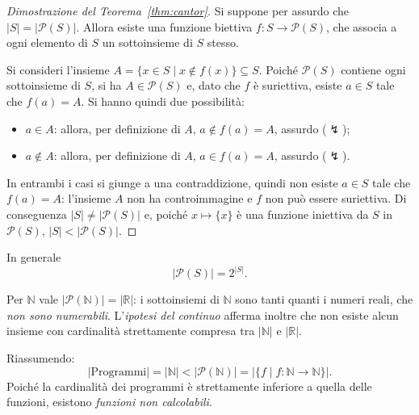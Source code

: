 \documentclass[a4paper, 11pt, oneside]{book}
\theoremstyle{formale}
\begin{document}
    \begin{proof}[Dimostrazione del Teorema~\ref{thm:cantor}]
        Si suppone per assurdo che $|S| = |\mathcal{P}(S)|$. Allora esiste una funzione
        biettiva $f \colon S \to \mathcal{P}(S)$, che associa a ogni elemento di $S$ un
        sottoinsieme di $S$ stesso.

        Si consideri l'insieme $A = \{x \in S \mid x \notin f(x)\} \subseteq S$. Poich\'e
        $\mathcal{P}(S)$ contiene ogni sottoinsieme di $S$, si ha $A \in \mathcal{P}(S)$ e,
        dato che $f$ \`e suriettiva, esiste $a \in S$ tale che $f(a) = A$. Si hanno quindi due
        possibilit\`a:
        \begin{itemize}
            \item $a \in A$: allora, per definizione di $A$, $a \notin f(a) = A$, assurdo
                ($\lightning$);
            \item $a \notin A$: allora, per definizione di $A$, $a \in f(a) = A$, assurdo
                ($\lightning$).
        \end{itemize}
        In entrambi i casi si giunge a una contraddizione, quindi non esiste $a \in S$ tale
        che $f(a) = A$: l'insieme $A$ non ha controimmagine e $f$ non pu\`o essere
        suriettiva. Di conseguenza $|S| \neq |\mathcal{P}(S)|$ e, poich\'e
        $x \mapsto \{x\}$ \`e una funzione iniettiva da $S$ in $\mathcal{P}(S)$,
        $|S| < |\mathcal{P}(S)|$.
    \end{proof}

    In generale
    \begin{equation*}
        |\mathcal{P}(S)| = 2^{|S|}.
    \end{equation*}

    Per $\mathbb{N}$ vale $|\mathcal{P}(\mathbb{N})| = |\mathbb{R}|$: i sottoinsiemi di
    $\mathbb{N}$ sono tanti quanti i numeri reali, che \emph{non sono numerabili}.
    L'\emph{ipotesi del continuo} afferma inoltre che non esiste alcun insieme con
    cardinalit\`a strettamente compresa tra $|\mathbb{N}|$ e $|\mathbb{R}|$.

    Riassumendo:
    \begin{equation*}
        |\text{Programmi}| = |\mathbb{N}|
        < |\mathcal{P}(\mathbb{N})|
        = |\{f \mid f \colon \mathbb{N} \to \mathbb{N}\}|.
    \end{equation*}
    Poich\'e la cardinalit\`a dei programmi \`e strettamente inferiore a quella delle
    funzioni, esistono \emph{funzioni non calcolabili}.
\end{document}

